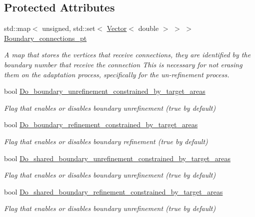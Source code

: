 \subsection*{Protected Attributes}
\begin{DoxyCompactItemize}
\item 
std\+::map$<$ unsigned, std\+::set$<$ \hyperlink{classoomph_1_1Vector}{Vector}$<$ double $>$ $>$ $>$ \hyperlink{classoomph_1_1RefineableTriangleMesh_a099ddd14a05c116188ecc3d6ec2f68d1}{Boundary\+\_\+connections\+\_\+pt}
\begin{DoxyCompactList}\small\item\em A map that stores the vertices that receive connections, they are identified by the boundary number that receive the connection This is necessary for not erasing them on the adaptation process, specifically for the un-\/refinement process. \end{DoxyCompactList}\item 
bool \hyperlink{classoomph_1_1RefineableTriangleMesh_a859abc98c895069efdd3af5c578e993e}{Do\+\_\+boundary\+\_\+unrefinement\+\_\+constrained\+\_\+by\+\_\+target\+\_\+areas}
\begin{DoxyCompactList}\small\item\em Flag that enables or disables boundary unrefinement (true by default) \end{DoxyCompactList}\item 
bool \hyperlink{classoomph_1_1RefineableTriangleMesh_aae4994b1d7eaf5f408dffa1376c1a743}{Do\+\_\+boundary\+\_\+refinement\+\_\+constrained\+\_\+by\+\_\+target\+\_\+areas}
\begin{DoxyCompactList}\small\item\em Flag that enables or disables boundary refinement (true by default) \end{DoxyCompactList}\item 
bool \hyperlink{classoomph_1_1RefineableTriangleMesh_a33354e28a1dc5f457f7e22ae19c1db4f}{Do\+\_\+shared\+\_\+boundary\+\_\+unrefinement\+\_\+constrained\+\_\+by\+\_\+target\+\_\+areas}
\begin{DoxyCompactList}\small\item\em Flag that enables or disables boundary unrefinement (true by default) \end{DoxyCompactList}\item 
bool \hyperlink{classoomph_1_1RefineableTriangleMesh_ab6a6a7aa732c31a8895ad502466ab242}{Do\+\_\+shared\+\_\+boundary\+\_\+refinement\+\_\+constrained\+\_\+by\+\_\+target\+\_\+areas}
\begin{DoxyCompactList}\small\item\em Flag that enables or disables boundary unrefinement (true by default) \end{DoxyCompactList}\item 

\end{DoxyCompactItemize}
